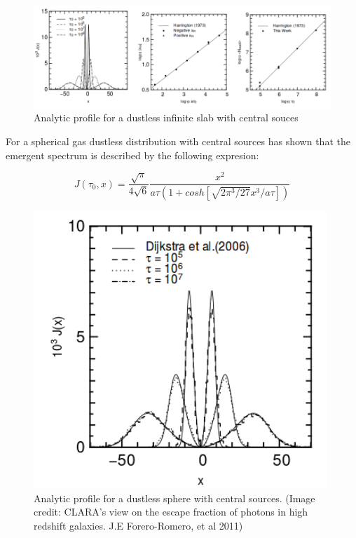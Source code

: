 \begin{figure}[H]
\begin{center}
\includegraphics[scale=0.4]{../Figures/slab.png}
\end{center}\caption{Analytic profile for a dustless infinite slab with central
\ly souces}
\end{figure}

For a spherical gas dustless distribution with central \ly sources \citep{Dijkstra06} has shown that the emergent spectrum is described by the following expresion:


\begin{equation}
J(\tau_0, x) = \dfrac{\sqrt{\pi}}{4\sqrt{6}}\dfrac{x^2}{a\tau (1+cosh[\sqrt{2\pi^3/27}x^3/a\tau])}
\end{equation}


\begin{figure}[H]
\begin{center}
\includegraphics[scale=0.4]{../Figures/Sphere.png}
\end{center}\caption{Analytic profile for a dustless sphere with central \ly sources. (Image credit: CLARA's view on the escape fraction of \ly photons in high redshift galaxies. J.E Forero-Romero, et al 2011)}
\end{figure}

